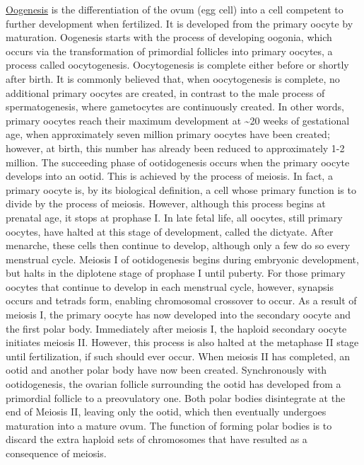 \href{https://en.wikipedia.org/wiki/Oogenesis}{Oogenesis} is the
differentiation of the ovum (egg cell) into a cell competent to further
development when fertilized. It is developed from the primary oocyte by
maturation. Oogenesis starts with the process of developing oogonia,
which occurs via the transformation of primordial follicles into primary
oocytes, a process called oocytogenesis. Oocytogenesis is complete
either before or shortly after birth. It is commonly believed that, when
oocytogenesis is complete, no additional primary oocytes are created, in
contrast to the male process of spermatogenesis, where gametocytes are
continuously created. In other words, primary oocytes reach their
maximum development at \textasciitilde{}20 weeks of gestational age,
when approximately seven million primary oocytes have been created;
however, at birth, this number has already been reduced to approximately
1-2 million. The succeeding phase of ootidogenesis occurs when the
primary oocyte develops into an ootid. This is achieved by the process
of meiosis. In fact, a primary oocyte is, by its biological definition,
a cell whose primary function is to divide by the process of meiosis.
However, although this process begins at prenatal age, it stops at
prophase I. In late fetal life, all oocytes, still primary oocytes, have
halted at this stage of development, called the dictyate. After
menarche, these cells then continue to develop, although only a few do
so every menstrual cycle. Meiosis I of ootidogenesis begins during
embryonic development, but halts in the diplotene stage of prophase I
until puberty. For those primary oocytes that continue to develop in
each menstrual cycle, however, synapsis occurs and tetrads form,
enabling chromosomal crossover to occur. As a result of meiosis I, the
primary oocyte has now developed into the secondary oocyte and the first
polar body. Immediately after meiosis I, the haploid secondary oocyte
initiates meiosis II. However, this process is also halted at the
metaphase II stage until fertilization, if such should ever occur. When
meiosis II has completed, an ootid and another polar body have now been
created. Synchronously with ootidogenesis, the ovarian follicle
surrounding the ootid has developed from a primordial follicle to a
preovulatory one. Both polar bodies disintegrate at the end of Meiosis
II, leaving only the ootid, which then eventually undergoes maturation
into a mature ovum. The function of forming polar bodies is to discard
the extra haploid sets of chromosomes that have resulted as a
consequence of meiosis.

